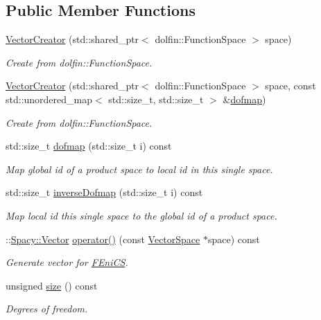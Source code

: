 \subsection*{Public Member Functions}
\begin{DoxyCompactItemize}
\item 
\hyperlink{classSpacy_1_1FEniCS_1_1VectorCreator_aadf9d699ede2e83816411523175248d8}{Vector\-Creator} (std\-::shared\-\_\-ptr$<$ dolfin\-::\-Function\-Space $>$ space)
\begin{DoxyCompactList}\small\item\em Create from dolfin\-::\-Function\-Space. \end{DoxyCompactList}\item 
\hyperlink{classSpacy_1_1FEniCS_1_1VectorCreator_a642f907081ec0796b871a5e290b9679d}{Vector\-Creator} (std\-::shared\-\_\-ptr$<$ dolfin\-::\-Function\-Space $>$ space, const std\-::unordered\-\_\-map$<$ std\-::size\-\_\-t, std\-::size\-\_\-t $>$ \&\hyperlink{classSpacy_1_1FEniCS_1_1VectorCreator_ad41a34e44494e8d166f9890a8877f994}{dofmap})
\begin{DoxyCompactList}\small\item\em Create from dolfin\-::\-Function\-Space. \end{DoxyCompactList}\item 
std\-::size\-\_\-t \hyperlink{classSpacy_1_1FEniCS_1_1VectorCreator_ad41a34e44494e8d166f9890a8877f994}{dofmap} (std\-::size\-\_\-t i) const 
\begin{DoxyCompactList}\small\item\em Map global id of a product space to local id in this single space. \end{DoxyCompactList}\item 
std\-::size\-\_\-t \hyperlink{classSpacy_1_1FEniCS_1_1VectorCreator_a8e369dcbb722462ee0bca008eae6b2f3}{inverse\-Dofmap} (std\-::size\-\_\-t i) const 
\begin{DoxyCompactList}\small\item\em Map local id this single space to the global id of a product space. \end{DoxyCompactList}\item 
\-::\hyperlink{classSpacy_1_1Vector}{Spacy\-::\-Vector} \hyperlink{classSpacy_1_1FEniCS_1_1VectorCreator_ab5121de05ec984b99febef9e839068dc}{operator()} (const \hyperlink{classSpacy_1_1VectorSpace}{Vector\-Space} $\ast$space) const 
\begin{DoxyCompactList}\small\item\em Generate vector for \hyperlink{namespaceSpacy_1_1FEniCS}{F\-Eni\-C\-S}. \end{DoxyCompactList}\item 
\hypertarget{classSpacy_1_1FEniCS_1_1VectorCreator_afb8357f953730e792e18e8bc16a585b4}{unsigned \hyperlink{classSpacy_1_1FEniCS_1_1VectorCreator_afb8357f953730e792e18e8bc16a585b4}{size} () const }\label{classSpacy_1_1FEniCS_1_1VectorCreator_afb8357f953730e792e18e8bc16a585b4}

\begin{DoxyCompactList}\small\item\em Degrees of freedom. \end{DoxyCompactList}\end{DoxyCompactItemize}


